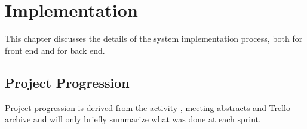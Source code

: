 
\chapter{Implementation}

This chapter discusses the details of the system implementation process, both for front end and for back end.


\section{Project Progression}
Project progression is derived from the activity , meeting abstracts  and Trello archive   and will only briefly summarize what was done at each sprint.


